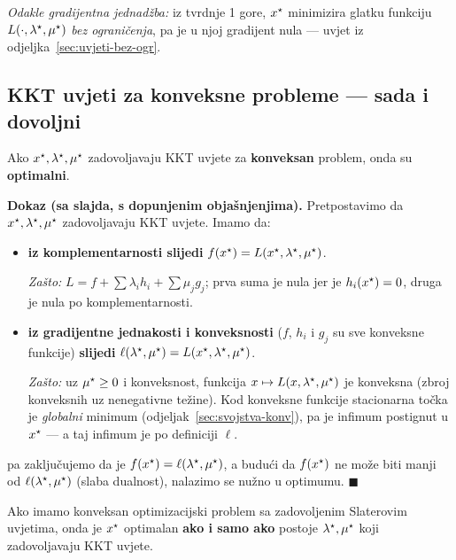 \emph{Odakle gradijentna jednadžba:} iz tvrdnje 1 gore, $x^{\star}$ minimizira
glatku funkciju $L(\cdot,\lambda^{\star},\mu^{\star})$ \emph{bez ograničenja}, pa je u
njoj gradijent nula --- uvjet iz odjeljka~\ref{sec:uvjeti-bez-ogr}.

\subsection{KKT uvjeti za konveksne probleme --- sada i dovoljni}

\begin{teorem}[Dovoljnost]
Ako $x^{\star}, \lambda^{\star}, \mu^{\star}$ zadovoljavaju KKT uvjete za \textbf{konveksan}
problem, onda su \textbf{optimalni}.
\end{teorem}

\textbf{Dokaz (sa slajda, s dopunjenim objašnjenjima).} Pretpostavimo da
$x^{\star}, \lambda^{\star}, \mu^{\star}$ zadovoljavaju KKT uvjete. Imamo da:

\begin{itemize}
  \item \textbf{iz komplementarnosti slijedi} $f(x^{\star}) =
        L(x^{\star},\lambda^{\star},\mu^{\star})$.

        \emph{Zašto:} $L = f + \sum\lambda_ih_i + \sum\mu_jg_j$; prva suma je
        nula jer je $h_i(x^{\star}) = 0$, druga je nula po komplementarnosti.
  \item \textbf{iz gradijentne jednakosti i konveksnosti} ($f$, $h_i$ i $g_j$
        su sve konveksne funkcije) \textbf{slijedi}
        $\ell(\lambda^{\star},\mu^{\star}) = L(x^{\star},\lambda^{\star},\mu^{\star})$.

        \emph{Zašto:} uz $\mu^{\star} \ge 0$ i konveksnost, funkcija
        $x \mapsto L(x,\lambda^{\star},\mu^{\star})$ je konveksna (zbroj konveksnih uz
        nenegativne težine). Kod konveksne funkcije stacionarna točka je
        \emph{globalni} minimum (odjeljak~\ref{sec:svojstva-konv}), pa je
        infimum postignut u $x^{\star}$ --- a taj infimum je po definiciji $\ell$.
\end{itemize}

pa zaključujemo da je $f(x^{\star}) = \ell(\lambda^{\star},\mu^{\star})$, a budući da
$f(x^{\star})$ ne može biti manji od $\ell(\lambda^{\star},\mu^{\star})$ (slaba dualnost),
nalazimo se nužno u optimumu. $\blacksquare$

\begin{teorem}
Ako imamo konveksan optimizacijski problem sa zadovoljenim Slaterovim uvjetima,
onda je $x^{\star}$ optimalan \textbf{ako i samo ako} postoje $\lambda^{\star},
\mu^{\star}$ koji zadovoljavaju KKT uvjete.
\end{teorem}

